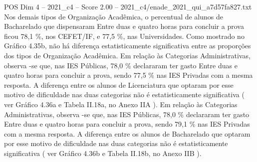 \begin{textsample}{POS Dim 4 – 2021\_c4 – Score 2.00 – 2021\_c4/enade\_2021\_qui\_a7d57fa827.txt}
Nos demais tipos de Organização Acadêmica, o percentual de alunos de Bacharelado que dispensaram Entre duas e quatro horas para concluir a prova ficou 78,1 \%, nos CEFET/IF, e 77,5 \%, nas Universidades.
Como mostrado no Gráfico 4.35b, não há diferença estatisticamente significativa entre as proporções dos tipos de Organização Acadêmica.
Em relação às Categorias Administrativas, observa -se que, nas IES Públicas, 78,0 \% declararam ter gasto Entre duas e quatro horas para concluir a prova, sendo 77,5 \% nas IES Privadas com a mesma resposta.
A diferença entre os alunos de Licenciatura que optaram por esse motivo de dificuldade nas duas categorias não é estatisticamente significativa ( ver Gráfico 4.36a e Tabela II.18a, no Anexo IIA ).
Em relação às Categorias Administrativas, observa -se que, nas IES Públicas, 78,0 \% declararam ter gasto Entre duas e quatro horas para concluir a prova, sendo 79,1 \% nas IES Privadas com a mesma resposta.
A diferença entre os alunos de Bacharelado que optaram por esse motivo de dificuldade nas duas categorias não é estatisticamente significativa ( ver Gráfico 4.36b e Tabela II.18b, no Anexo IIB ).

\end{textsample}
